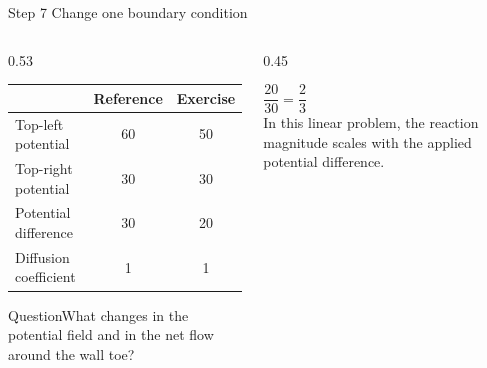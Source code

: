 \documentclass[aspectratio=169,10pt]{beamer}
\begin{document}
\begin{frame}{Step 7 \quad Change one boundary condition}
\begin{columns}[T,onlytextwidth]
\begin{column}{0.53\textwidth}
\begin{tabular}{lcc}\toprule
 & Reference & Exercise\\\midrule
Top-left potential & 60 & 50\\
Top-right potential & 30 & 30\\
Potential difference & 30 & 20\\
Diffusion coefficient & 1 & 1\\\bottomrule
\end{tabular}
\vspace{0.36cm}
\begin{block}{Question}\small What changes in the potential field and in the net flow around the wall toe?\end{block}
\end{column}
\begin{column}{0.45\textwidth}
\begin{center}\vspace{0.22cm}
{\Huge\color{tecblue}$\dfrac{20}{30}=\dfrac{2}{3}$}\\[0.35cm]
\small In this linear problem, the reaction magnitude scales with the applied potential difference.
\end{center}
\end{column}
\end{columns}
\end{frame}
\end{document}
